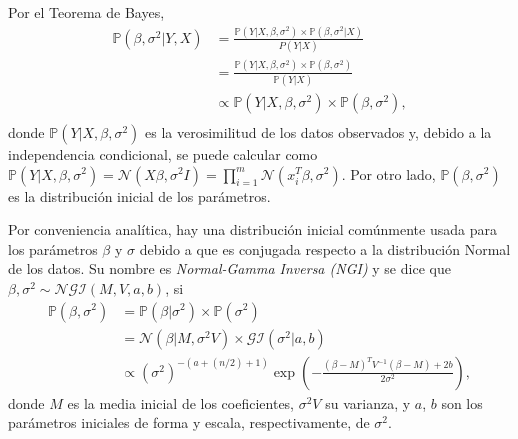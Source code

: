 Por el Teorema de Bayes,
\begin{equation*}
\begin{aligned}
    \mathbb{P}(\beta,\sigma^2 | Y, X) 
    &= \frac{\mathbb{P}(Y| X, \beta, \sigma^2) \times \mathbb{P}(\beta, \sigma^2 | X)}{P(Y | X)} \\
    &= \frac{\mathbb{P}(Y| X, \beta, \sigma^2) \times \mathbb{P}(\beta, \sigma^2)}{\mathbb{P}(Y | X)} \\
    &\propto \mathbb{P}(Y| X, \beta, \sigma^2) \times \mathbb{P}(\beta, \sigma^2), \\
\end{aligned}
\end{equation*}
donde $\mathbb{P}(Y| X, \beta, \sigma^2)$ es la verosimilitud de los datos observados y, debido a la independencia condicional, se puede calcular como $\mathbb{P}(Y| X, \beta, \sigma^2) = \mathcal{N}(X\beta,\sigma^2 I) = \prod_{i=1}^m \mathcal{N}(x_i^T\beta,\sigma^2)$. Por otro lado, $\mathbb{P}(\beta,\sigma^2)$ es la distribuci\'on inicial de los par\'ametros.

Por conveniencia anal\'itica, hay una distribuci\'on inicial com\'unmente usada para los par\'ametros $\beta$ y $\sigma$ debido a que es conjugada respecto a la distribuci\'on Normal de los datos. Su nombre es \textit{Normal-Gamma Inversa (NGI)} y se dice que $\beta,\sigma^2 \sim \mathcal{NGI}(M,V,a,b)$, si
\begin{equation*}
\begin{aligned}
    \mathbb{P}(\beta,\sigma^2) 
    &= \mathbb{P}(\beta|\sigma^2) \times \mathbb{P}(\sigma^2) \\
    &= \mathcal{N}(\beta|M, \sigma^2 V) \times \mathcal{GI}(\sigma ^2|a,b) \\
    &\propto (\sigma^2)^{-(a+(n/2)+1)} \exp\left(-\frac{(\beta-M)^TV^{-1}(\beta-M) + 2b}{2\sigma^2}\right),
\end{aligned}
\end{equation*}
donde $M$ es la media inicial de los coeficientes, $\sigma^2 V$ su varianza, y $a$, $b$ son los par\'ametros iniciales de forma y escala, respectivamente, de $\sigma ^2$. 

